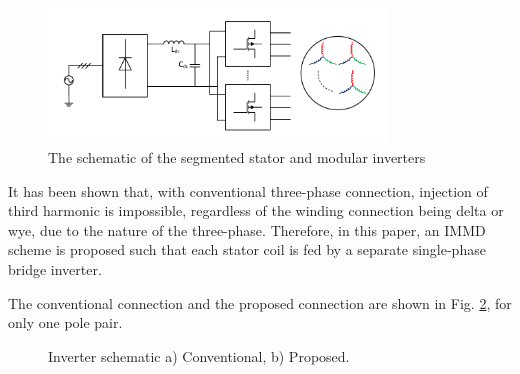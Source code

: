 \documentclass[conference,a4paper,twocolumn]{IEEEtran}
\begin{document}
\begin{figure}[htp]
  \centering
  \includegraphics[width=9cm]{segmented}
  \caption{The schematic of the segmented stator and modular inverters}
  \label{fig:segmented}
\end{figure}

It has been shown that, with conventional three-phase connection, injection of third harmonic is impossible, regardless of the winding connection being delta or wye, due to the nature of the three-phase. Therefore, in this paper, an IMMD scheme is proposed such that each stator coil is fed by a separate single-phase bridge inverter.

The conventional connection and the proposed connection are shown in Fig. \ref{fig:conv_conn}, for only one pole pair.


\begin{figure}[] 
\centering
{} \hfil 
{}
\caption{Inverter schematic a) Conventional, b) Proposed.} 
\label{fig:conv_conn} 
\end{figure}
\end{document}
